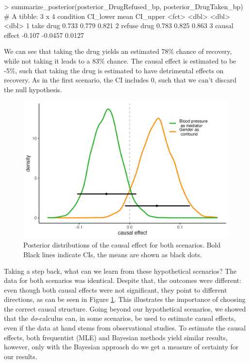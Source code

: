 \documentclass[nobib]{tufte-handout}
\newcommand{\docalc}{\emph{do}-calculus\xspace}
\begin{document}
\begin{minipage}[]{\textwidth}
\begin{rc}
> summarize_posterior(posterior_DrugRefused_bp, posterior_DrugTaken_bp)
# A tibble: 3 x 4
  condition     CI_lower    mean CI_upper
  <fct>            <dbl>   <dbl>    <dbl>
1 take drug        0.733  0.779    0.821 
2 refuse drug      0.783  0.825    0.863 
3 causal effect   -0.107 -0.0457   0.0127
\end{rc}
\end{minipage}

\vspace{-0.5cm}
We can see that taking the drug yields an estimated 78\% chance of recovery, while not taking it leads to a 83\% chance.
The causal effect is estimated to be -5\%, such that taking the drug is estimated to have detrimental effects on recovery.
As in the first scenario, the CI includes 0, such that we can't discard the null hypothesis.

\begin{figure}
    \centering
    \includegraphics[width=0.8\linewidth]{../img/posterior_causal_effect_smooth.png}
    \caption{Posterior distributions of the causal effect for both scenarios. Bold Black lines indicate CIs, the means are shown as black dots.}
    \label{fig:posteriors}
\end{figure}

Taking a step back, what can we learn from these hypothetical scenarios?
The data for both scenarios was identical.
Despite that, the outcomes were different: even though both causal effects were not significant, they point to different directions, as can be seen in Figure \ref{fig:posteriors}.
This illustrates the importance of choosing the correct causal structure. 
Going beyond our hypothetical scenarios, we showed that the \docalc can, in some scenarios, be used to estimate causal effects, even if the data at hand stems from observational studies.
To estimate the causal effects, both frequentist (MLE) and Bayesian methods yield similar results, however, only with the Bayesian approach do we get a measure of certainty for our results.
\end{document}

